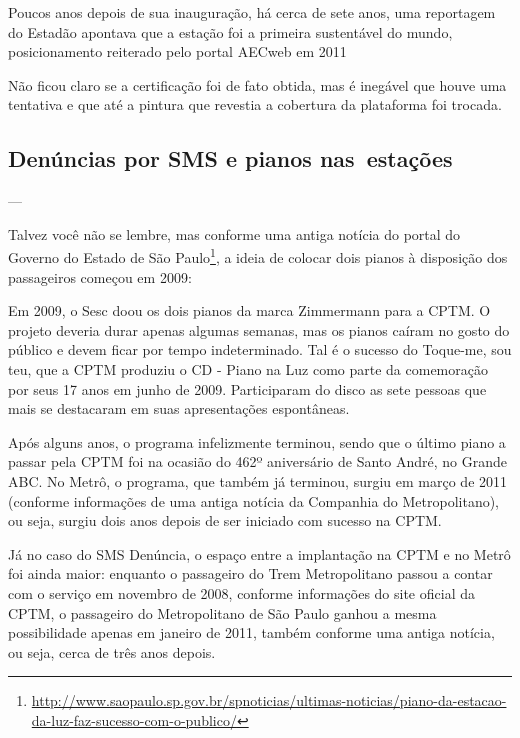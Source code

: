 \documentclass[11pt,fleqn]{book} %
\begin{document}
Poucos anos depois de sua inauguração, há cerca de sete anos, uma reportagem do Estadão apontava que a estação foi a primeira sustentável do mundo, posicionamento reiterado pelo portal AECweb em 2011


Não ficou claro se a certificação foi de fato obtida, mas é inegável que houve uma tentativa e que até a pintura que revestia a cobertura da plataforma foi trocada.

\subsection{Denúncias por SMS e pianos nas estações}

---

Talvez você não se lembre, mas conforme uma antiga notícia do portal do Governo do Estado de São Paulo\footnote{\url{http://www.saopaulo.sp.gov.br/spnoticias/ultimas-noticias/piano-da-estacao-da-luz-faz-sucesso-com-o-publico/}}, a ideia de colocar dois pianos à disposição dos passageiros começou em 2009:

\begin{citacao}
	Em 2009, o Sesc doou os dois pianos da marca Zimmermann para a CPTM. O projeto deveria durar apenas algumas semanas, mas os pianos caíram no gosto do público e devem ficar por tempo indeterminado. Tal é o sucesso do Toque-me, sou teu, que a CPTM produziu o CD - Piano na Luz como parte da comemoração por seus 17 anos em junho de 2009. Participaram do disco as sete pessoas que mais se destacaram em suas apresentações espontâneas.
\end{citacao}

Após alguns anos, o programa infelizmente terminou, sendo que o último piano a passar pela CPTM foi na ocasião do 462º aniversário de Santo André, no Grande ABC. No Metrô, o programa, que também já terminou, surgiu em março de 2011 (conforme informações de uma antiga notícia da Companhia do Metropolitano), ou seja, surgiu dois anos depois de ser iniciado com sucesso na CPTM.

Já no caso do SMS Denúncia, o espaço entre a implantação na CPTM e no Metrô foi ainda maior: enquanto o passageiro do Trem Metropolitano passou a contar com o serviço em novembro de 2008, conforme informações do site oficial da CPTM, o passageiro do Metropolitano de São Paulo ganhou a mesma possibilidade apenas em janeiro de 2011, também conforme uma antiga notícia, ou seja, cerca de três anos depois.
\end{document}
